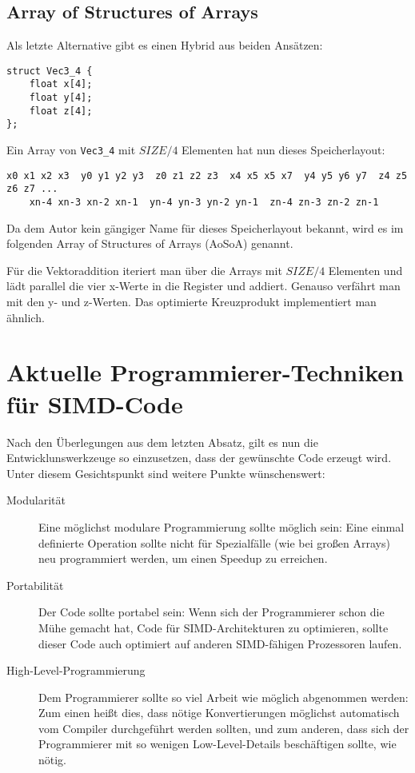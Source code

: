 \documentclass[a4paper,10pt]{article}
\begin{document}
\subsection{Array of Structures of Arrays}

Als letzte Alternative gibt es einen Hybrid aus beiden Ansätzen:

\begin{verbatim}
struct Vec3_4 {
    float x[4];
    float y[4];
    float z[4];
};
\end{verbatim}

Ein Array von \texttt{Vec3\_4} mit $SIZE/4$ Elementen hat nun dieses Speicherlayout:

\begin{verbatim}
x0 x1 x2 x3  y0 y1 y2 y3  z0 z1 z2 z3  x4 x5 x5 x7  y4 y5 y6 y7  z4 z5 z6 z7 ... 
    xn-4 xn-3 xn-2 xn-1  yn-4 yn-3 yn-2 yn-1  zn-4 zn-3 zn-2 zn-1
\end{verbatim}

Da dem Autor kein gängiger Name für dieses Speicherlayout bekannt, wird es im folgenden Array of
Structures of Arrays (AoSoA) genannt.

Für die Vektoraddition iteriert man über die Arrays mit $SIZE/4$ Elementen und lädt parallel 
die vier x-Werte in die Register und addiert. Genauso verfährt man mit den y- und z-Werten.
Das optimierte Kreuzprodukt implementiert man ähnlich.

\newpage
\section{Aktuelle Programmierer-Techniken für SIMD-Code}

Nach den Überlegungen aus dem letzten Absatz, gilt es nun die Entwicklunswerkzeuge so einzusetzen,
dass der gewünschte Code erzeugt wird. Unter diesem Gesichtspunkt sind weitere Punkte
wünschenswert:

\begin{description}
    \item[Modularität] Eine möglichst modulare Programmierung sollte möglich sein: Eine einmal definierte
    Operation sollte nicht für Spezialfälle (wie bei großen Arrays) neu programmiert werden, um
    einen Speedup zu erreichen.

    \item[Portabilität] Der Code sollte portabel sein: Wenn sich der Programmierer schon die Mühe
    gemacht hat, Code für SIMD-Architekturen zu optimieren, sollte dieser Code auch optimiert auf
    anderen SIMD-fähigen Prozessoren laufen.

    \item[High-Level-Programmierung] Dem Programmierer sollte so viel Arbeit wie möglich abgenommen werden: Zum einen heißt
    dies, dass nötige Konvertierungen möglichst automatisch vom Compiler durchgeführt werden
    sollten, und zum anderen, dass sich der Programmierer mit so wenigen Low-Level-Details
    beschäftigen sollte, wie nötig.

\end{description}
\end{document}
